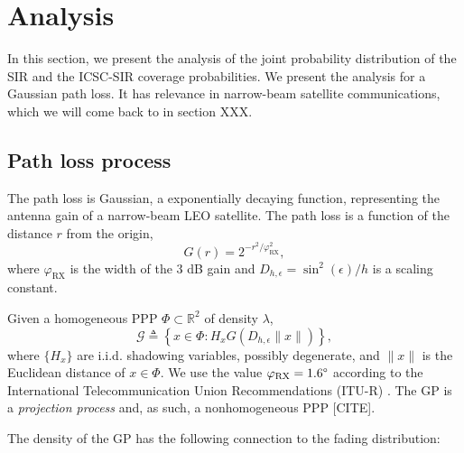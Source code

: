 \documentclass[conference]{IEEEtran}
\newcommand{\R}{\mathbb{R}}
\theoremstyle{definition}
\theoremstyle{plain}
\begin{document}
         
         \section{Analysis}
         In this section, we present the analysis of the joint probability distribution of the SIR and the ICSC-SIR coverage probabilities. We present the analysis for a Gaussian path loss. It has relevance in narrow-beam satellite communications, which we will come back to in section XXX.
         \subsection{Path loss process}
         The path loss is Gaussian, a exponentially decaying function, representing the antenna gain of a narrow-beam LEO satellite. The path loss is a function of the distance $r$ from the origin, 
         \begin{equation}
           G(r) = 2^{-r^2/\varphi^2_{\text{RX}}},
         \end{equation}
         where $\varphi_{\text{RX}}$ is the width of the $3$ dB gain and $D_{h,\epsilon}=\sin^2(\epsilon)/h$ is a scaling constant. 
          

         Given a homogeneous PPP $\Phi \subset \R^2$ of density $\lambda$,
         \begin{equation}
           \label{eq:gainprocess}
           \mathcal{G} \triangleq \left\{x \in \Phi : H_x G(D_{h,\epsilon}\|x\|) \right\},
          \end{equation}
          where $\{H_x\}$ are i.i.d. shadowing variables, possibly degenerate, and $\|x\|$ is the Euclidean distance of $x \in \Phi$. We use the value $\varphi_{\text{RX}} = 1.6 \degree$ according to the International Telecommunication Union Recommendations (ITU-R) \cite{ITURS1528}. The GP is a \textit{projection process} and, as such, a nonhomogeneous PPP [CITE].

          The density of the GP has the following connection to the fading distribution:
\end{document}
